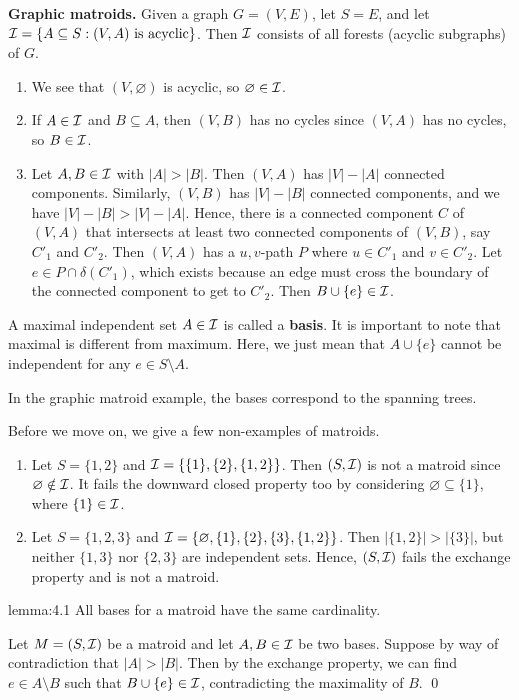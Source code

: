 {\bf Graphic matroids.} Given a graph $G = (V, E)$, let $S = E$, and let 
${\cal I} = \{A \subseteq S : (V, A) \text{ is acyclic}\}$. Then ${\cal I}$ 
consists of all forests (acyclic subgraphs) of $G$.
\begin{enumerate}[(1)]
    \item We see that $(V, \varnothing)$ is acyclic, so $\varnothing \in {\cal I}$. 
    \item If $A \in {\cal I}$ and $B \subseteq A$, then $(V, B)$ has no cycles 
    since $(V, A)$ has no cycles, so $B \in {\cal I}$. 
    \item Let $A, B \in {\cal I}$ with $|A| > |B|$. Then $(V, A)$ has 
    $|V| - |A|$ connected components. Similarly, $(V, B)$ has 
    $|V| - |B|$ connected components, and we have $|V| - |B| > |V| - |A|$. 
    Hence, there is a connected component $C$ of $(V, A)$ that intersects 
    at least two connected components of $(V, B)$, say $C'_1$ and $C'_2$.
    Then $(V, A)$ has a $u, v$-path $P$ where $u \in C'_1$ and 
    $v \in C'_2$. Let $e \in P \cap \delta(C'_1)$, which exists because 
    an edge must cross the boundary of the connected component to 
    get to $C'_2$. Then $B \cup \{e\} \in {\cal I}$.
\end{enumerate}

A maximal independent set $A \in {\cal I}$ is called a {\bf basis}.
It is important to note that maximal is different from maximum. 
Here, we just mean that $A \cup \{e\}$ cannot be independent for any 
$e \in S \setminus A$. 

In the graphic matroid example, the bases correspond to the spanning trees.

Before we move on, we give a few non-examples of matroids. 
\begin{enumerate}[(1)]
    \item Let $S = \{1, 2\}$ and ${\cal I} = \{\{1\}, \{2\}, \{1, 2\}\}$. 
    Then $(S, {\cal I})$ is not a matroid since $\varnothing \notin {\cal I}$. 
    It fails the downward closed property too by considering $\varnothing 
    \subseteq \{1\}$, where $\{1\} \in {\cal I}$.
    \item Let $S = \{1, 2, 3\}$ and ${\cal I} = \{\varnothing, \{1\}, \{2\}, \{3\}, 
    \{1, 2\}\}$. Then $|\{1, 2\}| > |\{3\}|$, but neither $\{1, 3\}$ nor 
    $\{2, 3\}$ are independent sets. Hence, $(S, {\cal I})$ fails the exchange 
    property and is not a matroid.
\end{enumerate}

\begin{lemma}{lemma:4.1}
    All bases for a matroid have the same cardinality.
\end{lemma}\vspace{-0.25cm}
\begin{pf}
    Let $M = (S, {\cal I})$ be a matroid and let $A, B \in {\cal I}$ be 
    two bases. Suppose by way of contradiction that $|A| > |B|$. 
    Then by the exchange property, we can find $e \in A \setminus B$ 
    such that $B \cup \{e\} \in {\cal I}$, contradicting the maximality of $B$. \qed
\end{pf}\vspace{-0.25cm}

